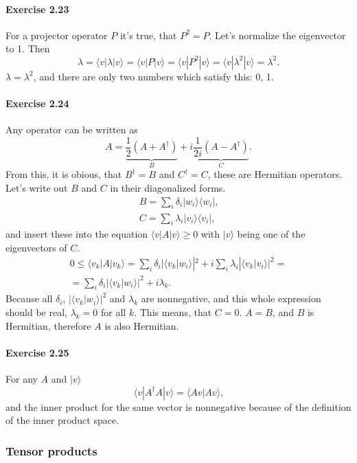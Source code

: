 \documentclass[a4paper,12pt]{article}
\newcommand{\exercise}[1]{\paragraph{Exercise #1}}
\newcommand{\la}{\langle}
\newcommand{\ra}{\rangle}
\begin{document}
    \exercise{2.23} For a projector operator $P$ it's true, that $P^2 = P$. Let's normalize the eigenvector to 1. Then
    \begin{equation}
        \lambda = \la v | \lambda | v \ra = \la v | P | v \ra = \la v | P^2 | v \ra = \la v | \lambda^2 | v \ra = \lambda^2 \textrm{.}
    \end{equation}
    $\lambda = \lambda^2$, and there are only two numbers which satisfy this: 0, 1.

    \exercise{2.24} \cite{goropikari} Any operator can be written as
    \begin{equation}
        A = \underbrace{\frac{1}{2}(A + A^\dagger)}_{B} + i \underbrace{\frac{1}{2i}(A - A^\dagger)}_{C} \textrm{.}
    \end{equation}
    From this, it is obious, that $B^\dagger = B$ and $C^\dagger = C$, these are Hermitian operators.
    Let's write out $B$ and $C$ in their diagonalized forms.
    \begin{gather}
        \nonumber
        B = \sum_i \delta_i | w_i \ra \la w_i | \textrm{,} \\
        C = \sum_i \lambda_i | v_i \ra \la v_i | \textrm{,}
    \end{gather}
    and insert these into the equation $\la v | A | v \ra \ge 0$ with $| v \ra$ being one of the eigenvectors of $C$.
    \begin{gather}
        \nonumber
        0 \le \la v_k | A | v_k \ra = \sum_i \delta_i | \la v_k | w_i \ra |^2 + i \sum_i \lambda_i | \la v_k | v_i \ra |^2 =\\
        = \sum_i \delta_i | \la v_k | w_i \ra |^2 + i \lambda_k \textrm{.}
    \end{gather}
    Because all $\delta_i$, $| \la v_k | w_i \ra |^2$ and $\lambda_k$ are nonnegative, and this whole expression should be real, $\lambda_k = 0$ for all $k$. This means, that $C = 0$. $A = B$, and $B$ is Hermitian, therefore $A$ is also Hermitian.

    \exercise{2.25} For any $A$ and $| v \ra$
    \begin{equation}
        \la v | A^\dagger A | v \ra = \la Av | Av \ra \textrm{,}
    \end{equation}
    and the inner product for the same vector is nonnegative because of the definition of the inner product space.

    \subsubsection{Tensor products}
\end{document}
